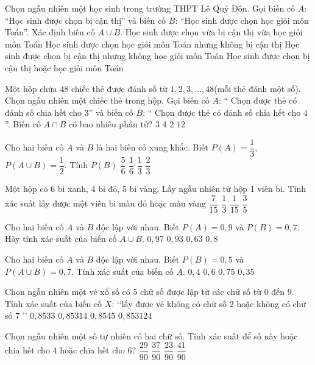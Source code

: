 \begin{ex}
Chọn ngẫu nhiên một học sinh trong trường THPT Lê Quý Đôn. Gọi biến cố $A$: “Học sinh được chọn bị cận thị” và biến cố $B$: “Học sinh được chọn học giỏi môn Toán”. Xác định biến cố $A\cup B$.
\choice
{Học sinh được chọn vừa bị cận thị vừa học giỏi môn Toán}
{Học sinh được chọn học giỏi môn Toán nhưng không bị cận thị}
{Học sinh được chọn bị cận thị nhưng không học giỏi môn Toán}
{Học sinh được chọn bị cận thị hoặc học giỏi môn Toán}
\end{ex}
\begin{ex}
Một hộp chứa $48$ chiếc thẻ được đánh số từ $1{,}2,3,\ldots,48$(mỗi thẻ đánh một số). Chọn ngẫu nhiên một chiếc thẻ trong hộp. Gọi biến cố $A$: “ Chọn được thẻ có đánh số chia hết cho $3$” và biến cố $B$: “ Chọn được thẻ có đánh số chia hết cho $4$”. Biến cố $A\cap B$ có bao nhiêu phần tử?
\choice
{$3$}
{$4$}
{$2$}
{$12$}
\end{ex}
\begin{ex}
Cho hai biến cố $A$ và $B$ là hai biến cố xung khắc. Biết $P(A)=\dfrac{1}{3}$, $P\left(A\cup B\right)=\dfrac{1}{2}$. Tính $P(B)$
\choice
{$\dfrac{5}{6}$}
{$\dfrac{1}{6}$}
{$\dfrac{1}{3}$}
{$\dfrac{2}{3}$}
\end{ex}
\begin{ex}
Một hộp có 6 bi xanh, 4 bi đỏ, 5 bi vàng. Lấy ngẫu nhiên từ hộp 1 viên bi. Tính xác suất lấy được một viên bi màu đỏ hoặc màu vàng
\choice
{$\dfrac{7}{15}$}
{$\dfrac{1}{3}$}
{$\dfrac{1}{15}$}
{$\dfrac{3}{5}$}
\end{ex}
\begin{ex}
Cho hai biến cố $A$ và $B$ độc lập với nhau. Biết $P(A)=0{,}9$ và $P(B)=0{,}7$. Hãy tính xác suất của biến cố $A \cup B$.
\choice
{$0{,}97$}
{$0{,}93$}
{$0{,}63$}
{$0{,}8$}
\end{ex}
\begin{ex}
Cho hai biến cố $A$ và $B$ độc lập với nhau. Biết $P(B)=0{,}5$ và $P(A \cup B)=0{,}7$. Tính xác suất của biến cố $A$.
\choice
{$0{,}4$}
{$0{,}6$}
{$0{,}75$}
{$0{,}35$}
\end{ex}
\begin{ex}
Chọn ngẫu nhiên một vé xổ số có 5 chữ số được lập từ các chữ số từ 0 đến 9. Tính xác suất của biến cố $X$: \lq\lq  lấy được vé không có chữ số 2 hoặc không có chữ số $7$ \rq\rq
\choice
{$0{,}8533$}
{$0{,}85314$}
{$0{,}8545$}
{$0{,}853124$}
\end{ex}
\begin{ex}
Chọn ngẫu nhiên một số tự nhiên có hai chữ số. Tính xác suất để số này hoặc chia hết cho 4 hoặc chia hết cho 6?
\choice
{$\dfrac{29}{90}$}
{$\dfrac{37}{90}$}
{$\dfrac{23}{90}$}
{$\dfrac{41}{90}$}
\end{ex}

